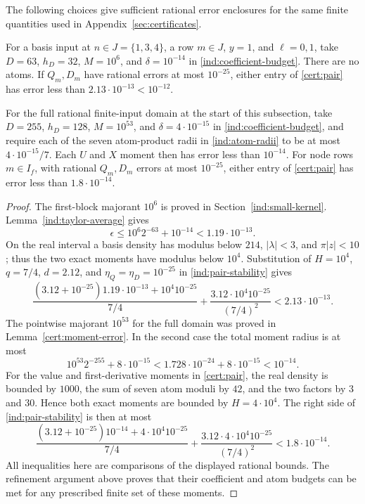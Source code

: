 \begin{proposition}\label{ind:taylor-budgets}
The following choices give sufficient rational error enclosures for the
same finite quantities used in Appendix~\ref{sec:certificates}.

For a basis input at $n\in J=\{1,3,4\}$, a row $m\in J$, $y=1$, and
$\ell=0,1$, take $D=63$, $h_D=32$, $M=10^6$, and $\delta=10^{-14}$ in
\eqref{ind:coefficient-budget}.  There are no atoms.  If $Q_m,D_m$ have
rational errors at most $10^{-25}$, either entry of \eqref{cert:pair}
has error less than $2.13\cdot10^{-13}<10^{-12}$.

For the full rational finite-input domain at the start of this subsection,
take $D=255$, $h_D=128$, $M=10^{53}$, and $\delta=4\cdot10^{-15}$ in
\eqref{ind:coefficient-budget}, and require each of the seven atom-product
radii in \eqref{ind:atom-radii} to be at most $4\cdot10^{-15}/7$.
Each $U$ and $X$ moment then has error less than $10^{-14}$.  For node
rows $m\in I_f$, with rational $Q_m,D_m$ errors at most $10^{-25}$, either
entry of \eqref{cert:pair} has error less than $1.8\cdot10^{-14}$.
\end{proposition}

\begin{proof}
The first-block majorant $10^6$ is proved in
Section~\ref{ind:small-kernel}.  Lemma~\ref{ind:taylor-average} gives
\[
 \epsilon\le10^6 2^{-63}+10^{-14}<1.19\cdot10^{-13}.
\]
On the real interval a basis density has modulus below $214$,
$|\lambda|<3$, and $\pi|z|<10$; thus the two exact moments have modulus
below $10^4$.  Substitution of $H=10^4$, $q=7/4$, $d=2.12$, and
$\eta_Q=\eta_D=10^{-25}$ in \eqref{ind:pair-stability} gives
\[
 \frac{(3.12+10^{-25})1.19\cdot10^{-13}+10^4 10^{-25}}{7/4}
 +\frac{3.12\cdot10^4 10^{-25}}{(7/4)^2}<2.13\cdot10^{-13}.
\]
The pointwise majorant $10^{53}$ for the full domain was proved in
Lemma~\ref{cert:moment-error}.  In the second case the total moment radius
is at most
\[
 10^{53}2^{-255}+8\cdot10^{-15}
 <1.728\cdot10^{-24}+8\cdot10^{-15}<10^{-14}.
\]
For the value and first-derivative moments in \eqref{cert:pair}, the real
density is bounded by $1000$, the sum of seven atom moduli by $42$, and
the two factors by $3$ and $30$.  Hence both exact moments are bounded
by $H=4\cdot10^4$.  The right side of \eqref{ind:pair-stability} is then
at most
\[
 \frac{(3.12+10^{-25})10^{-14}+4\cdot10^4 10^{-25}}{7/4}
 +\frac{3.12\cdot4\cdot10^4 10^{-25}}{(7/4)^2}<1.8\cdot10^{-14}.
\]
All inequalities here are comparisons of the displayed rational bounds.
The refinement argument above proves that their coefficient and atom
budgets can be met for any prescribed finite set of these moments.
\end{proof}


